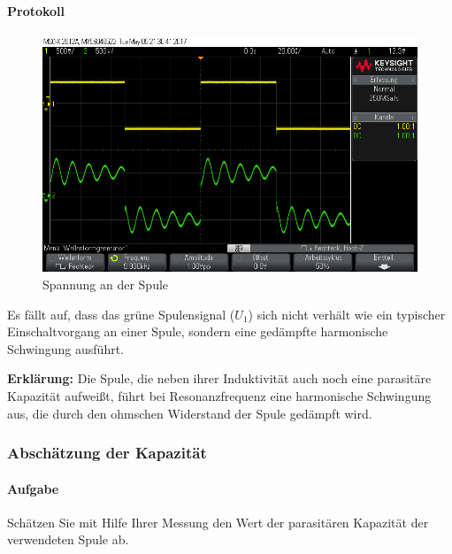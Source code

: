 \documentclass[10pt]{scrreprt}
\begin{document}
        \paragraph{Protokoll}
        \begin{center}
            \begin{figure}[H]
                \includegraphics[width=\textwidth]{scope_8.png}
                \caption{Spannung an der Spule}
            \end{figure}
        \end{center}

        Es fällt auf, dass das grüne Spulensignal ($U_1$) sich nicht verhält wie
        ein typischer Einschaltvorgang an einer Spule, sondern eine gedämpfte
        harmonische Schwingung ausführt.

        \textbf{Erklärung:} Die Spule, die neben ihrer Induktivität auch noch eine
        parasitäre Kapazität aufweißt, führt bei Resonanzfrequenz eine harmonische
        Schwingung aus, die durch den ohmschen Widerstand der Spule gedämpft wird.

        \subsubsection{Abschätzung der Kapazität}
        \paragraph{Aufgabe}
        Schätzen Sie mit Hilfe Ihrer Messung den Wert der parasitären Kapazität der
        verwendeten Spule ab.
\end{document}
